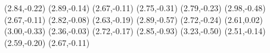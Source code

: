 \psdot[](2.84,-0.22)
\psdot[](2.89,-0.14)
\psdot[](2.67,-0.11)
\psdot[](2.75,-0.31)
\psdot[](2.79,-0.23)
\psdot[](2.98,-0.48)
\psdot[](2.67,-0.11)
\psdot[](2.82,-0.08)
\psdot[](2.63,-0.19)
\psdot[](2.89,-0.57)
\psdot[](2.72,-0.24)
\psdot[](2.61,0.02)
\psdot[](3.00,-0.33)
\psdot[](2.36,-0.03)
\psdot[](2.72,-0.17)
\psdot[](2.85,-0.93)
\psdot[](3.23,-0.50)
\psdot[](2.51,-0.14)
\psdot[](2.59,-0.20)
\psdot[](2.67,-0.11)
